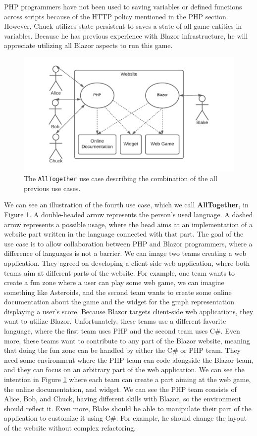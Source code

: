 PHP programmers have not been used to saving variables or defined functions across scripts because of the HTTP policy mentioned in the PHP section.
However, Chuck utilizes state persistent to saves a state of all game entities in variables.
Because he has previous experience with Blazor infrastructure, he will appreciate utilizing all Blazor aspects to run this game.
\par
\begin{figure}[t]\centering
\includegraphics[scale=0.8]{./img/UseCaseAllTogether}
\caption{The \texttt{AllTogether} use case describing the combination of the all previous use cases. }
\label{img09:usecase}
\end{figure} 
\par
We can see an illustration of the fourth use case, which we call \textbf{AllTogether}, in Figure \ref{img09:usecase}.
A double-headed arrow represents the person's used language. 
A dashed arrow represents a possible usage, where the head aims at an implementation of a website part written in the language connected with that part.
The goal of the use case is to allow collaboration between PHP and Blazor programmers, where a difference of languages is not a barrier.  
We can image two teams creating a web application. 
They agreed on developing a client-side web application, where both teams aim at different parts of the website.
For example, one team wants to create a fun zone where a user can play some web game, we can imagine something like Asteroids, and the second team wants to create some online documentation about the game and the widget for the graph representation displaying a user's score.
Because Blazor targets client-side web applications, they want to utilize Blazor.
Unfortunately, these teams use a different favorite language, where the first team uses PHP and the second team uses C\#.
Even more, these teams want to contribute to any part of the Blazor website, meaning that doing the fun zone can be handled by either the C\# or PHP team.
They need some environment where the PHP team can code alongside the Blazor team, and they can focus on an arbitrary part of the web application.
We can see the intention in Figure \ref{img09:usecase} where each team can create a part aiming at the web game, the online documentation, and widget.
We can see the PHP team consists of Alice, Bob, and Chuck, having different skills with Blazor, so the environment should reflect it.
Even more, Blake should be able to manipulate their part of the application to customize it using C\#. For example, he should change the layout of the website without complex refactoring. 

